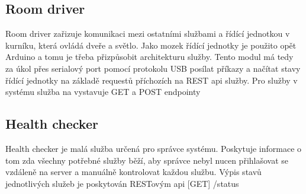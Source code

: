 \subsection{Room driver}
Room driver zařizuje komunikaci mezi ostatními službami a řídící jednotkou v kurníku, která ovládá dveře a světlo.\newline
Jako mozek řídící jednotky je použito opět Arduino a tomu je třeba přizpůsobit architekturu služby.
Tento modul má tedy za úkol přes serialový port pomocí protokolu USB posílat příkazy a načítat stavy řídící jednotky na základě requestů příchozích na REST api služby.
Pro služby v systému služba na vystavuje GET a POST endpointy

\subsection{Health checker}
Health checker je malá služba určená pro správce systému.\newline
Poskytuje informace o tom zda všechny potřebné služby běží, aby správce nebyl nucen přihlašovat se vzdáleně na server a manuálně kontrolovat každou službu.
Výpis stavů jednotlivých služeb je poskytován RESTovým api [GET] /status

